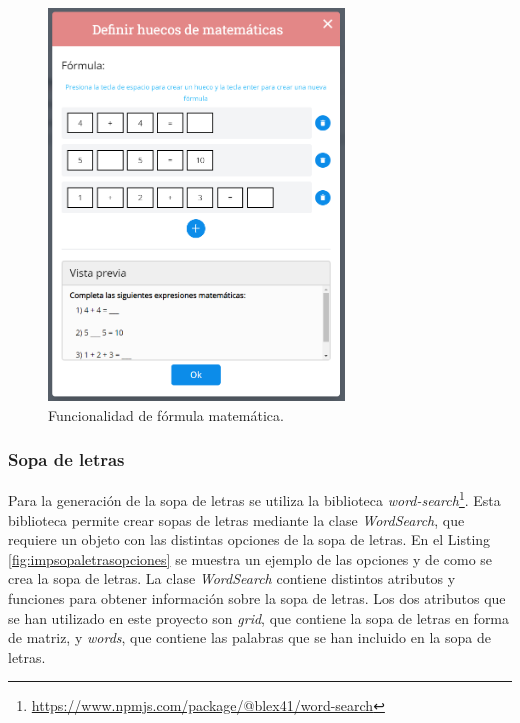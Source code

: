\begin{figure}[ht!]
  \centering
  \includegraphics[width=0.7\textwidth]{Imagenes/Funcionalidades/MathFormulaModal.PNG}
  \caption{Funcionalidad de fórmula matemática.}
  \label{fig:funcionalidadFormulaMatematica}
\end{figure}

\subsubsection{Sopa de letras}
\label{sec:impsopaletras}
Para la generación de la sopa de letras se utiliza la biblioteca \textit{word-search}\footnote{\url{https://www.npmjs.com/package/@blex41/word-search}}. Esta biblioteca permite crear sopas de letras mediante la clase \textit{WordSearch}, que requiere un objeto con las distintas opciones de la sopa de letras. En el Listing \ref{fig:impsopaletrasopciones} se muestra un ejemplo de las opciones y de como se crea la sopa de letras. La clase \textit{WordSearch} contiene distintos atributos y funciones para obtener información sobre la sopa de letras. Los dos atributos que se han utilizado en este proyecto son \textit{grid}, que contiene la sopa de letras en forma de matriz, y \textit{words}, que contiene las palabras que se han incluido en la sopa de letras.

